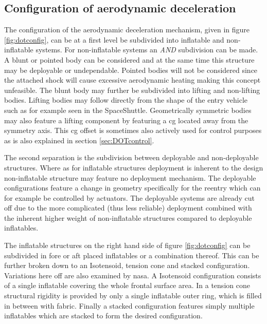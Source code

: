 \subsection{Configuration of aerodynamic deceleration}
The configuration of the aerodynamic deceleration mechanism, given in figure \ref{fig:dotconfig}, can be at a first level be subdivided into inflatable and non-inflatable systems. For non-inflatable systems an \textit{AND} subdivision can be made. A blunt or pointed body can be considered and at the same time this structure may be deployable or undependable. Pointed bodies will not be considered since the attached shock will cause excessive aerodynamic heating \cite{AndersonJr.2007} making this concept unfeasible. The blunt body may further be subdivided into lifting and non-lifting bodies. Lifting bodies may follow directly from the shape of the entry vehicle such as for example seen in the SpaceShuttle. Geometrically symmetric bodies may also feature a lifting component by featuring a \gls{cg} located away from the symmetry axis. This \gls{cg} offset is sometimes also actively used for control purposes\cite{Dillman2012} as is also explained in section \ref{sec:DOTcontrol}. 

The second separation is  the subdivision between deployable and non-deployable structures. Where as for inflatable structures deployment is inherent to the design non-inflatable structure may feature no deployment mechanism. The deployable configurations feature a change in geometry specifically for the reentry which can for example be controlled by actuators. The deployable systems are already cut off due to the more complicated (thus less reliable) deployment combined with the inherent higher weight of non-inflatable structures \cite{Cianciolo2010} compared to deployable inflatables.

The inflatable structures on the right hand side of figure \ref{fig:dotconfig} can be subdivided in fore or aft placed inflatables or a combination thereof. This can be further broken down to an Isotensoid, tension cone and stacked configuration. Variations here off are also examined by \gls{nasa}\cite{Smith2010}. A Isotensoid configuration consists of a single inflatable covering the whole frontal surface area. In a tension cone structural rigidity is provided by only a single inflatable outer ring, which is filled in between with fabric. Finally a stacked configuration features simply multiple inflatables which are stacked to form the desired configuration.

